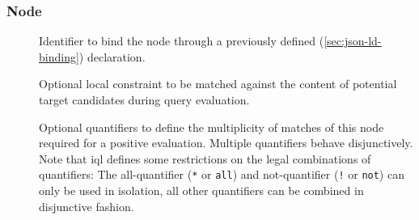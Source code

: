 \documentclass[11pt,a4paper]{article}
\begin{document}
\subsubsection{Node}
\label{sec:json-ld-node}
\begin{attributes}{}
\end{attributes}
\begin{description}
	\item[] Identifier to bind the node through a previously defined  (\ref{sec:json-ld-binding}) declaration.
\end{description}
\begin{elements}{}
\end{elements}
\begin{description}
	\item[] Optional local constraint to be matched against the content of potential target candidates during query evaluation.
	\item[] Optional quantifiers to define the multiplicity of matches of this node required for a positive evaluation. Multiple quantifiers behave disjunctively. Note that \ac{iql} defines some restrictions on the legal combinations of quantifiers: The all-quantifier (\texttt{*} or \texttt{all}) and not-quantifier (\texttt{!} or \texttt{not}) can only be used in isolation, all other quantifiers can be combined in disjunctive fashion.
\end{description}

\end{document}
